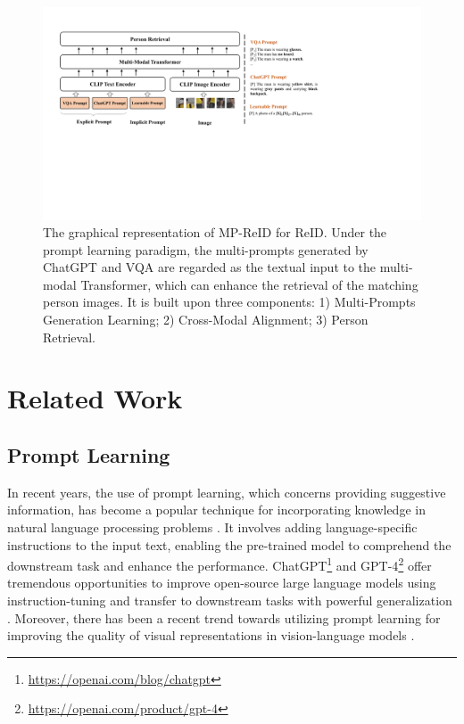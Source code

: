 \documentclass[letterpaper]{article} %
\begin{document}
\begin{figure}[t]
    \centering
    \includegraphics[width=\linewidth]{framework.pdf}
    \caption{The graphical representation of MP-ReID for ReID. Under the prompt learning paradigm, the multi-prompts generated by ChatGPT and VQA are regarded as the textual input to the multi-modal Transformer, which can enhance the retrieval of the matching person images. It is built upon three components: 1) Multi-Prompts Generation Learning; 2) Cross-Modal Alignment; 3) Person Retrieval.}
    \label{frameangel}
\end{figure}

\section{Related Work}
\subsection{Prompt Learning}

In recent years, the use of prompt learning, which concerns providing suggestive information, has become a popular technique for incorporating knowledge in natural language processing problems \cite{petroni2019language, song2022v2p,jin2023domain}. It involves adding language-specific instructions to the input text, enabling the pre-trained model to comprehend the downstream task and enhance the performance. ChatGPT\footnote{\url{https://openai.com/blog/chatgpt}} and GPT-4\footnote{\url{https://openai.com/product/gpt-4}} offer tremendous opportunities to improve open-source large language models using instruction-tuning \cite{peng2023instruction} and transfer to downstream tasks with powerful generalization \cite{zhang2023one}. Moreover, there has been a recent trend towards utilizing prompt learning for improving the quality of visual representations in vision-language models \cite{ju2022prompting, rao2022denseclip}. 
\end{document}
